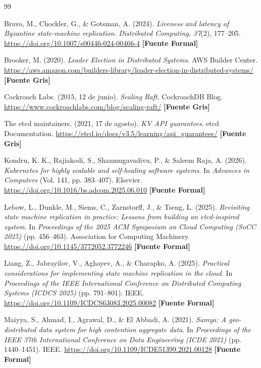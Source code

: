 \documentclass[12pt,letterpaper]{article}
\begin{document}
\begin{thebibliography}{99}

Bravo, M., Chockler, G., \& Gotsman, A. (2024).
\textit{Liveness and latency of Byzantine state-machine replication}.
\textit{Distributed Computing, 37}(2), 177--205.
\url{https://doi.org/10.1007/s00446-024-00466-4} \textbf{[Fuente Formal]}

Brooker, M. (2020).
\textit{Leader Election in Distributed Systems}. 
AWS Builder Center. 
\url{https://aws.amazon.com/builders-library/leader-election-in-distributed-systems/} \textbf{[Fuente Gris]}

Cockroach Labs. (2015, 12 de junio). 
\textit{Scaling Raft}. 
CockroachDB Blog. 
\url{https://www.cockroachlabs.com/blog/scaling-raft/} \textbf{[Fuente Gris]}

The etcd maintainers. (2021, 17 de agosto). 
\textit{KV API guarantees}. 
etcd Documentation. 
\url{https://etcd.io/docs/v3.5/learning/api_guarantees/} \textbf{[Fuente Gris]}

Kondru, K. K., Rajiakodi, S., Shanmugavadivu, P., \& Saleem Raja, A. (2026).
\textit{Kubernetes for highly scalable and self-healing software systems}.
In \textit{Advances in Computers} (Vol. 141, pp. 383--407).
Elsevier.
\url{https://doi.org/10.1016/bs.adcom.2025.06.010} \textbf{[Fuente Formal]}

Lebow, L., Dunkle, M., Siems, C., Zarnstorff, J., \& Tseng, L. (2025).
\textit{Revisiting state machine replication in practice: Lessons from building an etcd-inspired system}.
In \textit{Proceedings of the 2025 ACM Symposium on Cloud Computing (SoCC 2025)} (pp. 456--463).
Association for Computing Machinery.
\url{https://doi.org/10.1145/3772052.3772246} \textbf{[Fuente Formal]}

Liang, Z., Jabrayilov, V., Aghayev, A., \& Charapko, A. (2025).
\textit{Practical considerations for implementing state machine replication in the cloud}.
In \textit{Proceedings of the IEEE International Conference on Distributed Computing Systems (ICDCS 2025)} (pp. 791--801).
IEEE.
\url{https://doi.org/10.1109/ICDCS63083.2025.00082} \textbf{[Fuente Formal]}

Maiyya, S., Ahmad, I., Agrawal, D., \& El Abbadi, A. (2021).
\textit{Samya: A geo-distributed data system for high contention aggregate data}.
In \textit{Proceedings of the IEEE 37th International Conference on Data Engineering (ICDE 2021)} (pp. 1440--1451).
IEEE.
\url{https://doi.org/10.1109/ICDE51399.2021.00128} \textbf{[Fuente Formal]}


\end{thebibliography}
\end{document}

